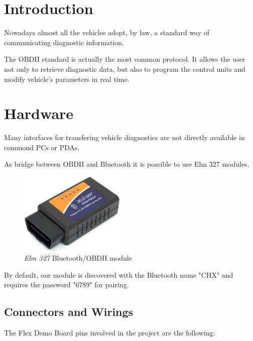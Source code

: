 \documentclass[twoside]{article}
\begin{document}
\begin{multicols}{2} %

\section{Introduction}

\lettrine[nindent=0em,lines=2.5]{N} owadays almost all the vehicles adopt, by law, a standard way of communicating diagnostic information.

The OBDII standard is actually the most common protocol. It allows the user not only to retrieve diagnostic data, but also to program the control units and modify vehicle's parameters in real time.


\section{Hardware}

Many interfaces for transfering vehicle diagnostics are not directly available in commond PCs or PDAs.

As bridge between OBDII and Bluetooth it is possible to use Elm 327 modules.

\begin{figure}[H]
  \centering
  \includegraphics[width=2in]{img/elm_327_presentation}
  \caption{\textit{Elm 327} Bluetooth/OBDII module}
\end{figure}

By default, our module is discovered with the Bluetooth name "CHX" and requires the password "6789" for pairing.

\subsection{Connectors and Wirings}

The Flex Demo Board pins involved in the project are the following:


\end{multicols}
\end{document}
